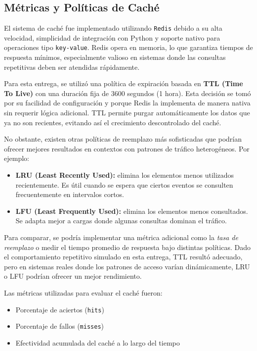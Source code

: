 \documentclass[12pt]{article}
\begin{document}
\subsection{Métricas y Políticas de Caché}

El sistema de caché fue implementado utilizando \texttt{Redis} debido a su alta velocidad, simplicidad de integración con Python y soporte nativo para operaciones tipo \texttt{key-value}. Redis opera en memoria, lo que garantiza tiempos de respuesta mínimos, especialmente valioso en sistemas donde las consultas repetitivas deben ser atendidas rápidamente.

Para esta entrega, se utilizó una política de expiración basada en \textbf{TTL (Time To Live)} con una duración fija de 3600 segundos (1 hora). Esta decisión se tomó por su facilidad de configuración y porque Redis la implementa de manera nativa sin requerir lógica adicional. TTL permite purgar automáticamente los datos que ya no son recientes, evitando así el crecimiento descontrolado del caché.

No obstante, existen otras políticas de reemplazo más sofisticadas que podrían ofrecer mejores resultados en contextos con patrones de tráfico heterogéneos. Por ejemplo:

\begin{itemize}
    \item \textbf{LRU (Least Recently Used):} elimina los elementos menos utilizados recientemente. Es útil cuando se espera que ciertos eventos se consulten frecuentemente en intervalos cortos.
    \item \textbf{LFU (Least Frequently Used):} elimina los elementos menos consultados. Se adapta mejor a cargas donde algunas consultas dominan el tráfico.
\end{itemize}

Para comparar, se podría implementar una métrica adicional como la \textit{tasa de reemplazo} o medir el tiempo promedio de respuesta bajo distintas políticas. Dado el comportamiento repetitivo simulado en esta entrega, TTL resultó adecuado, pero en sistemas reales donde los patrones de acceso varían dinámicamente, LRU o LFU podrían ofrecer un mejor rendimiento.

Las métricas utilizadas para evaluar el caché fueron:

\begin{itemize}
    \item Porcentaje de aciertos (\texttt{hits})
    \item Porcentaje de fallos (\texttt{misses})
    \item Efectividad acumulada del caché a lo largo del tiempo
\end{itemize}
\end{document}
